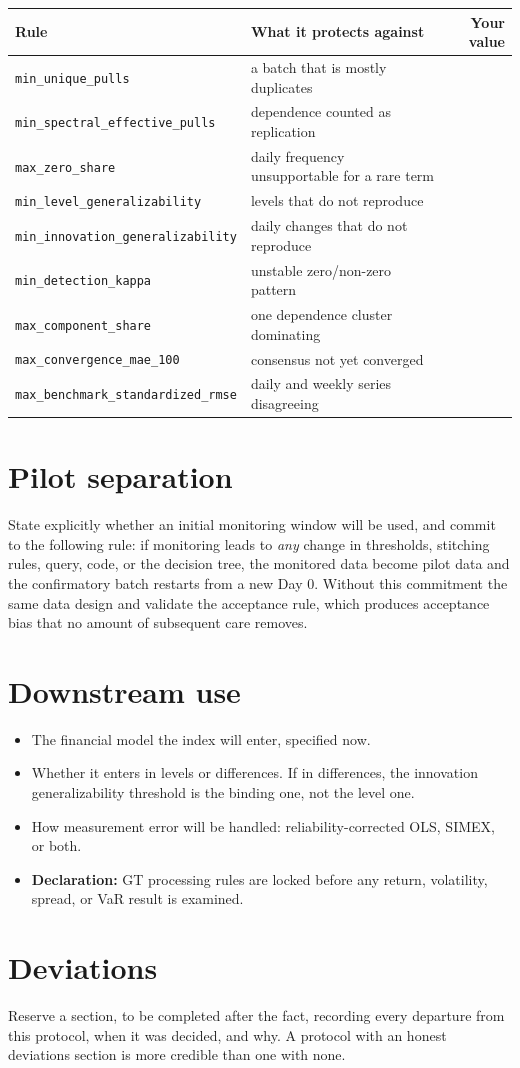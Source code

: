 \documentclass[12pt,a4paper,oneside]{article}
\begin{document}
\begin{table}[H]
\centering\small
\begin{tabularx}{\textwidth}{lXr}
\toprule
Rule & What it protects against & Your value\\
\midrule
\texttt{min\_unique\_pulls} & a batch that is mostly duplicates & \\
\texttt{min\_spectral\_effective\_pulls} & dependence counted as replication & \\
\texttt{max\_zero\_share} & daily frequency unsupportable for a rare term & \\
\texttt{min\_level\_generalizability} & levels that do not reproduce & \\
\texttt{min\_innovation\_generalizability} & daily changes that do not reproduce & \\
\texttt{min\_detection\_kappa} & unstable zero/non-zero pattern & \\
\texttt{max\_component\_share} & one dependence cluster dominating & \\
\texttt{max\_convergence\_mae\_100} & consensus not yet converged & \\
\texttt{max\_benchmark\_standardized\_rmse} & daily and weekly series disagreeing & \\
\bottomrule
\end{tabularx}
\end{table}

\section{Pilot separation}

State explicitly whether an initial monitoring window will be used, and commit
to the following rule: if monitoring leads to \emph{any} change in thresholds,
stitching rules, query, code, or the decision tree, the monitored data become
pilot data and the confirmatory batch restarts from a new Day 0. Without this
commitment the same data design and validate the acceptance rule, which produces
acceptance bias that no amount of subsequent care removes.

\section{Downstream use}

\begin{itemize}
\item The financial model the index will enter, specified now.
\item Whether it enters in levels or differences. If in differences, the
innovation generalizability threshold is the binding one, not the level one.
\item How measurement error will be handled: reliability-corrected OLS, SIMEX,
or both.
\item \textbf{Declaration:} GT processing rules are locked before any return,
volatility, spread, or VaR result is examined.
\end{itemize}

\section{Deviations}

Reserve a section, to be completed after the fact, recording every departure
from this protocol, when it was decided, and why. A protocol with an honest
deviations section is more credible than one with none.
\end{document}
